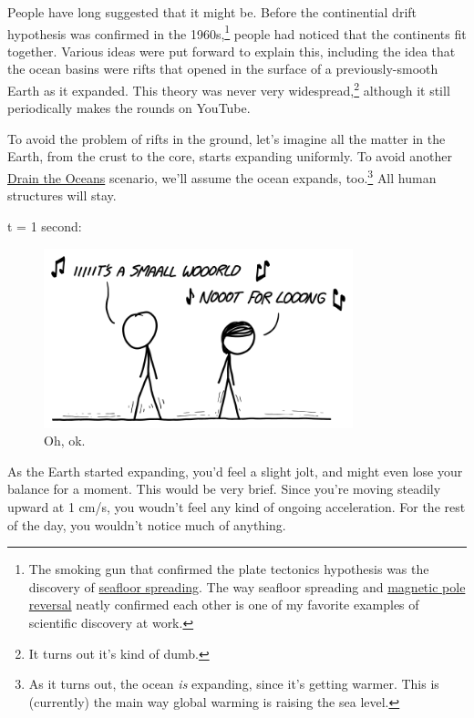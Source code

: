 {{People have long suggested that it might be. Before the continential drift hypothesis was confirmed in the 1960s,{\footnote{The smoking gun that confirmed the plate tectonics hypothesis was the discovery of \href{https://en.wikipedia.org/wiki/Seafloor\_spreading}{seafloor spreading}. The way seafloor spreading and \href{https://en.wikipedia.org/wiki/Geomagnetic\_reversal}{magnetic pole reversal} neatly confirmed each other is one of my favorite examples of scientific discovery at work.} } people had noticed that the continents fit together. Various ideas were put forward to explain this, including the idea that the ocean basins were rifts that opened in the surface of a previously-smooth Earth as it expanded. This theory was never very widespread,{\footnote{It turns out it's kind of dumb.} } although it still periodically makes the rounds on YouTube.}

{To avoid the problem of rifts in the ground, let's imagine all the matter in the Earth, from the crust to the core, starts expanding uniformly. To avoid another \href{http://what-if.xkcd.com/53/}{Drain the Oceans} scenario, we'll assume the ocean expands, too.{\footnote{As it turns out, the ocean \emph{is} expanding, since it's getting warmer. This is (currently) the main way global warming is raising the sea level.} } All human structures will stay.}

{t = 1 second:}

\begin{figure}[!htbp]
\centering
\includegraphics[scale=0.5, max width=0.8\textwidth]{imgs/a/67/expanding_jolt.png}
\caption{Oh, ok.}
\end{figure}

{As the Earth started expanding, you'd feel a slight jolt, and might even lose your balance for a moment. This would be very brief. Since you're moving steadily upward at 1 cm/s, you woudn't feel any kind of ongoing acceleration. For the rest of the day, you wouldn't notice much of anything.}

}
